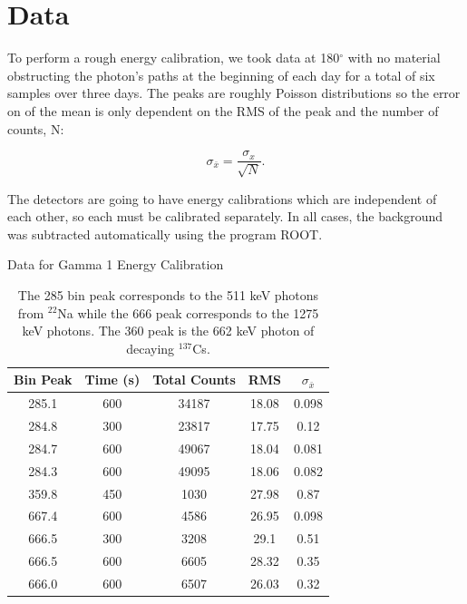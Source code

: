 \documentclass[10pt]{IEEEtran}
\begin{document}
\section{Data}

To perform a rough energy calibration, we took data at 180$^\circ$ with no material obstructing the photon's paths at the beginning of each day for a total of six samples over three days. The peaks are roughly Poisson distributions so the error on of the mean is only dependent on the RMS of the peak and the number of counts, N\cite{bevington}:

	\begin{equation}
		\sigma_{\bar{x}} = \frac{\sigma_x}{\sqrt{N}}.
	\end{equation}
	
The detectors are going to have energy calibrations which are independent of each other, so each must be calibrated separately. In all cases, the background was subtracted automatically using the program ROOT.
    \begin{table}[!hbt]
        \begin{center}
        \begin{normalsize}Data for Gamma 1 Energy Calibration\end{normalsize}
        \begin{tabular}{|c|c|c|c|c|}
			\hline        	
        	Bin Peak & Time (s) & Total Counts & RMS & $\sigma_{\bar{x}}$ \\    
            \hline
            285.1 & 600 & 34187 & 18.08 & 0.098 \\
            \hline
            284.8 & 300 & 23817 & 17.75 & 0.12 \\
            \hline
            284.7 & 600 & 49067 & 18.04 & 0.081 \\
            \hline
            284.3 & 600 & 49095 & 18.06 & 0.082 \\
            \hline
            359.8 & 450 & 1030 & 27.98 & 0.87 \\
            \hline
            667.4 & 600 & 4586 & 26.95 & 0.098 \\
            \hline
            666.5 & 300 & 3208 & 29.1 & 0.51 \\
            \hline
            666.5 & 600 & 6605 & 28.32 & 0.35 \\
            \hline
            666.0 & 600 & 6507 & 26.03 & 0.32 \\
            \hline
       \end{tabular}
       \caption{The 285 bin peak corresponds to the 511 keV photons from $^{22}$Na while the 666 peak corresponds to the 1275 keV photons. The 360 peak is the 662 keV photon of decaying $^{137}$Cs\cite{sonzogni}.}
       \label{tab:gam1}
       \end{center}
    \end{table}
    
\end{document}
